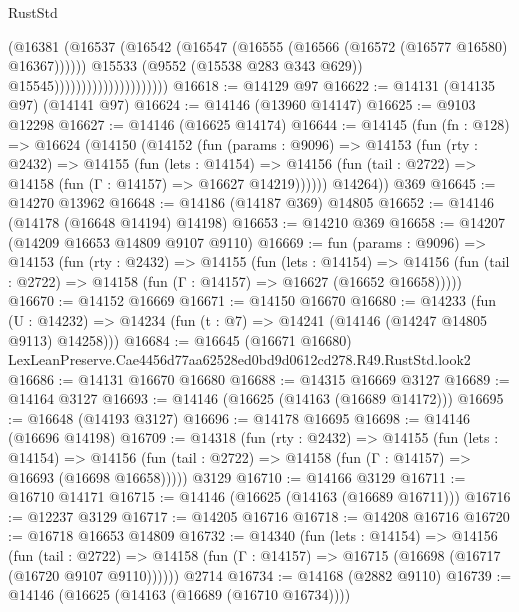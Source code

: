 \begin{lexlean}{RustStd}
\begin{coremodule}
                                            (@16381
                                              (@16537
                                                (@16542
                                                  (@16547
                                                    (@16555
                                                      (@16566 (@16572 (@16577 @16580) @16367))))))
                                              @15533
                                              (@9552 (@15538 @283 @343 @629))
                                              @15545)))))))))))))))))))))
@16618 := @14129 @97
@16622 := @14131 (@14135 @97) (@14141 @97)
@16624 := @14146 (@13960 @14147)
@16625 := @9103 @12298
@16627 := @14146 (@16625 @14174)
@16644 := @14145
    (fun (fn : @128) =>
    @16624
      (@14150
        (@14152
          (fun (params : @9096) =>
          @14153
            (fun (rty : @2432) =>
            @14155
              (fun (lets : @14154) =>
              @14156 (fun (tail : @2722) => @14158 (fun (Γ : @14157) => @16627 @14219))))))
        @14264))
    @369
@16645 := @14270 @13962
@16648 := @14186 (@14187 @369) @14805
@16652 := @14146 (@14178 (@16648 @14194) @14198)
@16653 := @14210 @369
@16658 := @14207 (@14209 @16653 @14809 @9107 @9110)
@16669 := fun (params : @9096) =>
  @14153
    (fun (rty : @2432) =>
    @14155
      (fun (lets : @14154) =>
      @14156 (fun (tail : @2722) => @14158 (fun (Γ : @14157) => @16627 (@16652 @16658)))))
@16670 := @14152 @16669
@16671 := @14150 @16670
@16680 := @14233
    (fun (U : @14232) => @14234 (fun (t : @7) => @14241 (@14146 (@14247 @14805 @9113) @14258)))
@16684 := @16645 (@16671 @16680) LexLeanPreserve.Cae4456d77aa62528ed0bd9d0612cd278.R49.RustStd.look2
@16686 := @14131 @16670 @16680
@16688 := @14315 @16669 @3127
@16689 := @14164 @3127
@16693 := @14146 (@16625 (@14163 (@16689 @14172)))
@16695 := @16648 (@14193 @3127)
@16696 := @14178 @16695
@16698 := @14146 (@16696 @14198)
@16709 := @14318
    (fun (rty : @2432) =>
    @14155
      (fun (lets : @14154) =>
      @14156 (fun (tail : @2722) => @14158 (fun (Γ : @14157) => @16693 (@16698 @16658)))))
    @3129
@16710 := @14166 @3129
@16711 := @16710 @14171
@16715 := @14146 (@16625 (@14163 (@16689 @16711)))
@16716 := @12237 @3129
@16717 := @14205 @16716
@16718 := @14208 @16716
@16720 := @16718 @16653 @14809
@16732 := @14340
    (fun (lets : @14154) =>
    @14156
      (fun (tail : @2722) =>
      @14158 (fun (Γ : @14157) => @16715 (@16698 (@16717 (@16720 @9107 @9110))))))
    @2714
@16734 := @14168 (@2882 @9110)
@16739 := @14146 (@16625 (@14163 (@16689 (@16710 @16734))))

\end{coremodule}
\end{lexlean}
